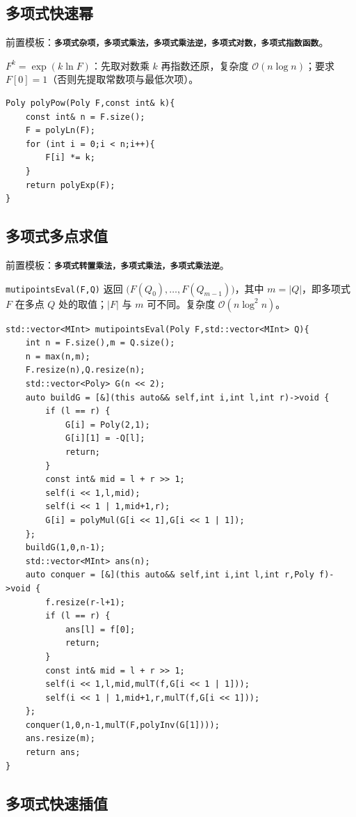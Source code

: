 \subsection{多项式快速幂}

前置模板：\textbf{\texttt{多项式杂项，多项式乘法，多项式乘法逆，多项式对数，多项式指数函数}}。

$F^k=\exp(k\ln F)$：先取对数乘 $k$ 再指数还原，复杂度 $\mathcal{O}(n\log n)$；要求 $F[0]=1$（否则先提取常数项与最低次项）。

\begin{lstlisting}
Poly polyPow(Poly F,const int& k){
    const int& n = F.size();
    F = polyLn(F);
    for (int i = 0;i < n;i++){
        F[i] *= k;
    }
    return polyExp(F);
}
\end{lstlisting}

\subsection{多项式多点求值}

前置模板：\textbf{\texttt{多项式转置乘法，多项式乘法，多项式乘法逆}}。

\texttt{mutipointsEval(F,Q)} 返回 $\big(F(Q_0),\dots,F(Q_{m-1})\big)$，其中 $m=|Q|$，即多项式 $F$ 在多点 $Q$ 处的取值；$|F|$ 与 $m$ 可不同。复杂度 $\mathcal{O}(n\log^2 n)$。

\begin{lstlisting}
std::vector<MInt> mutipointsEval(Poly F,std::vector<MInt> Q){
    int n = F.size(),m = Q.size();
    n = max(n,m);
    F.resize(n),Q.resize(n);
    std::vector<Poly> G(n << 2);
    auto buildG = [&](this auto&& self,int i,int l,int r)->void {
        if (l == r) {
            G[i] = Poly(2,1);
            G[i][1] = -Q[l];
            return;
        }
        const int& mid = l + r >> 1;
        self(i << 1,l,mid);
        self(i << 1 | 1,mid+1,r);
        G[i] = polyMul(G[i << 1],G[i << 1 | 1]);
    };
    buildG(1,0,n-1);
    std::vector<MInt> ans(n);
    auto conquer = [&](this auto&& self,int i,int l,int r,Poly f)->void {
        f.resize(r-l+1);
        if (l == r) {
            ans[l] = f[0];
            return;
        }
        const int& mid = l + r >> 1;
        self(i << 1,l,mid,mulT(f,G[i << 1 | 1]));
        self(i << 1 | 1,mid+1,r,mulT(f,G[i << 1]));
    };
    conquer(1,0,n-1,mulT(F,polyInv(G[1])));
    ans.resize(m);
    return ans;
}
\end{lstlisting}

\subsection{多项式快速插值}

